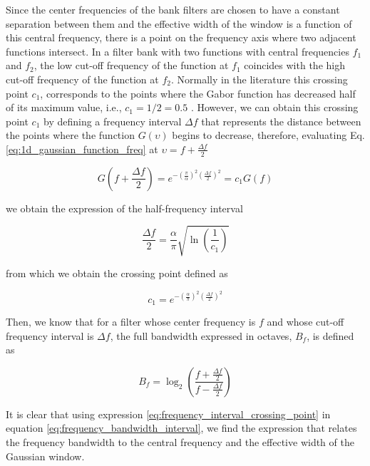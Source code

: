 Since the center frequencies of the bank filters are chosen to have a constant separation between them and the effective width of the window is a function of this central frequency, there is a point on the frequency axis where two adjacent functions intersect. In a filter bank with two functions with central frequencies $f_1$ and $f_2$, the low cut-off frequency of the function at $f_1$ coincides with the high cut-off frequency of the function at $f_2$. Normally in the literature this crossing point $c_1$, corresponds to the points where the Gabor function has decreased half of its maximum value, i.e., $c_1= 1/2=0.5$ \cite{Granlund:CGIP:1978}. However, we can obtain this crossing point $c_1$ by defining a frequency interval $\Delta f$ that represents the distance between the points where the function $G(\upsilon)$ begins to decrease, therefore, evaluating Eq. \eqref{eq:1d_gaussian_function_freq} at $\upsilon = f + \frac{\Delta f}{2}$

\begin{equation}\label{eq:constant_crossing_point}
    G\left(f + \frac{\Delta f}{2}\right) = e^{-\left(\frac{\pi}{\alpha}\right)^2 \left(\frac{\Delta f}{2}\right)^2} = c_1 G(f) 
\end{equation}

we obtain the expression of the half-frequency interval 

\begin{equation}\label{eq:frequency_interval_crossing_point}
    \frac{\Delta f}{2} = \frac{\alpha}{\pi}\sqrt{\ln \left(\frac{1}{c_1}\right)}
\end{equation}

from which we obtain the crossing point defined as

\begin{equation}\label{eq:crossing_point}
    c_1 = e^{-\left(\frac{\alpha}{\pi} \right)^2 \left(\frac{\Delta f}{2}\right)^2 }
\end{equation}

Then, we know that for a filter whose center frequency is $f$ and whose cut-off frequency interval is $\Delta f$, the full bandwidth expressed in octaves, $B_f$, is defined as \cite{Daugman:JOSA:1985a}

\begin{equation}\label{eq:frequency_bandwidth_interval}
    B_f = \log_2 \left( \frac{f + \frac{\Delta f}{2} }{f - \frac{\Delta f}{2}} \right)
\end{equation}

It is clear that using expression \eqref{eq:frequency_interval_crossing_point} in equation \eqref{eq:frequency_bandwidth_interval}, we find the expression that relates the frequency bandwidth to the central frequency and the effective width of the Gaussian window.

